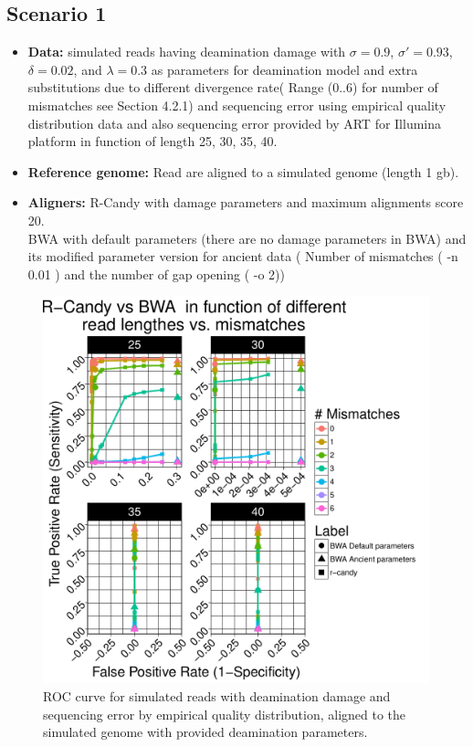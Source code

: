 \documentclass[11pt,a4paper]{report}
\begin{document}
\subsection{Scenario 1 }
\begin{itemize}
   \item \textbf{Data:} simulated reads having deamination damage with $ \sigma = 0.9$, 
$ \sigma\prime = 0.93 $, $\delta = 0.02 $,  and $\lambda = 0.3 $ as parameters for 
deamination model and extra substitutions due to different divergence rate( Range 
(0..6) for number of mismatches see Section 4.2.1) and sequencing error using 
empirical quality distribution data and also sequencing error provided by ART 
for Illumina platform in function of length 25, 30, 35, 40.
  \item \textbf{Reference genome:}  Read are aligned to a simulated genome (length 1 gb).
  \item \textbf{Aligners:} R-Candy with damage parameters and maximum alignments score 20. \\
BWA with default parameters (there are no damage parameters in BWA) and its 
modified parameter version for ancient data ( Number of mismatches ( -n 0.01 ) 
and the number of gap opening ( -o 2))

  \end{itemize}

\begin{figure}[H]
\centering
\includegraphics[width=12cm]{pictures/bROC_DS1_emp.pdf}
\caption{ROC curve for simulated reads with deamination damage and sequencing 
error by empirical quality distribution, aligned to the simulated genome
with provided deamination parameters.}
\label{DS1_emp}
\end{figure}
\end{document}
